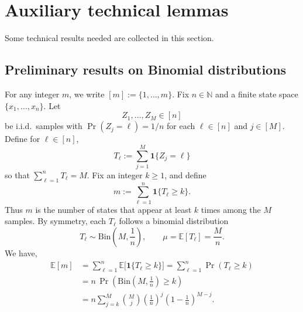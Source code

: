 \documentclass[aps,prx,reprint,superscriptaddress,amsmath,amssymb,longbibliography,floatfix]{revtex4-2}
\newcommand{\dsE}{\mathbb{E}}
\theoremstyle{plain}
\theoremstyle{definition}
\theoremstyle{remark}
\begin{document}



\section{Auxiliary technical lemmas}
Some technical results needed are collected in this section.
\subsection{Preliminary results on Binomial distributions}
For any integer $m$, we write $[m] := \{1, \dots, m\}$. Fix \(n\in\mathbb N\) and a finite state space \(\{x_1,\dots,x_{n}\}\). Let
\[
  Z_1,\dots,Z_M \in [n] 
\]
be i.i.d.\ samples with
\(\Pr(Z_j = \ell) = 1/n\) for each $\ell\in [n]$ and $j\in [M]$. Define for $\ell\in[n]$,
\begin{equation}
  T_\ell := \sum_{j=1}^M \mathbf 1\{Z_j = \ell \}
\label{eq:app-occupancy-label-count}
\end{equation}
so that \(\sum_{\ell=1}^n T_\ell = M\).
Fix an integer \(k\geq 1\), and define
\begin{equation}
  m := \sum_{\ell=1}^n \mathbf 1\{T_\ell \geq k\}.
\label{eq:app-occupancy-collision-count}
\end{equation}
Thus \(m\) is the number of states that appear at least $k$ times among the $M$ samples. By symmetry, each \(T_\ell\) follows a binomial distribution
\[
  T_\ell \sim \mathrm{Bin}\!\left(M,\frac1n\right),
  \qquad
  \mu = \dsE[T_\ell] = \frac{M}{n}.
\]
We have, 
\begin{align*}
  \dsE [m]
  &= \sum_{\ell=1}^n \dsE\big[ \mathbf 1\{T_\ell \geq k\} \big]
   = \sum_{\ell=1}^n \Pr(T_\ell \geq k) \\
  &= n \,\Pr\!\left(\mathrm{Bin}\!\left(M,\frac1n\right)\geq k\right)\\
  &= n \sum_{j=k}^M \binom{M}{j}\left(\frac1n\right)^j\left(1-\frac1n\right)^{M-j} .
\end{align*}
\end{document}
